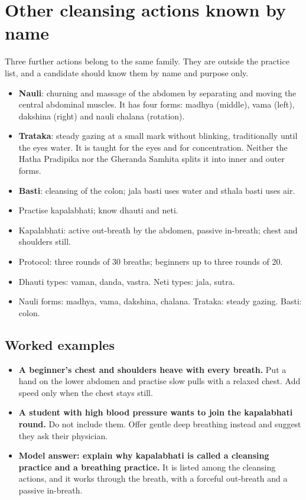 
\section{Other cleansing actions known by name}

Three further actions belong to the same family. They are outside the practice list, and a candidate should know them by name and purpose only.
\begin{itemize}
\item \textbf{Nauli}: churning and massage of the abdomen by separating and moving the central abdominal muscles. It has four forms: madhya (middle), vama (left), dakshina (right) and nauli chalana (rotation).
\item \textbf{Trataka}: steady gazing at a small mark without blinking, traditionally until the eyes water. It is taught for the eyes and for concentration. Neither the Hatha Pradipika nor the Gheranda Samhita splits it into inner and outer forms.
\item \textbf{Basti}: cleansing of the colon; jala basti uses water and sthala basti uses air.
\end{itemize}


\begin{recall}
\begin{itemize}
\item Practise kapalabhati; know dhauti and neti.
\item Kapalabhati: active out-breath by the abdomen, passive in-breath; chest and shoulders still.
\item Protocol: three rounds of 30 breaths; beginners up to three rounds of 20.
\item Dhauti types: vaman, danda, vastra. Neti types: jala, sutra.
\item Nauli forms: madhya, vama, dakshina, chalana. Trataka: steady gazing. Basti: colon.
\end{itemize}
\end{recall}

\subsection*{Worked examples}
\begin{itemize}
\item \textbf{A beginner's chest and shoulders heave with every breath.} Put a hand on the lower abdomen and practise slow pulls with a relaxed chest. Add speed only when the chest stays still.
\item \textbf{A student with high blood pressure wants to join the kapalabhati round.} Do not include them. Offer gentle deep breathing instead and suggest they ask their physician.
\item \textbf{Model answer: explain why kapalabhati is called a cleansing practice and a breathing practice.} It is listed among the cleansing actions, and it works through the breath, with a forceful out-breath and a passive in-breath.
\end{itemize}

